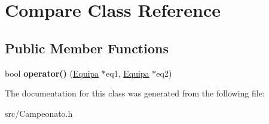 \hypertarget{class_compare}{}\section{Compare Class Reference}
\label{class_compare}
\subsection*{Public Member Functions}
\begin{DoxyCompactItemize}
\item 
\hypertarget{class_compare_a3e0bc4d0a0653c71e7c54e1a206dfc31}{}bool {\bfseries operator()} (\hyperlink{class_equipa}{Equipa} $\ast$eq1, \hyperlink{class_equipa}{Equipa} $\ast$eq2)\label{class_compare_a3e0bc4d0a0653c71e7c54e1a206dfc31}

\end{DoxyCompactItemize}


The documentation for this class was generated from the following file\+:\begin{DoxyCompactItemize}
\item 
src/Campeonato.\+h\end{DoxyCompactItemize}
